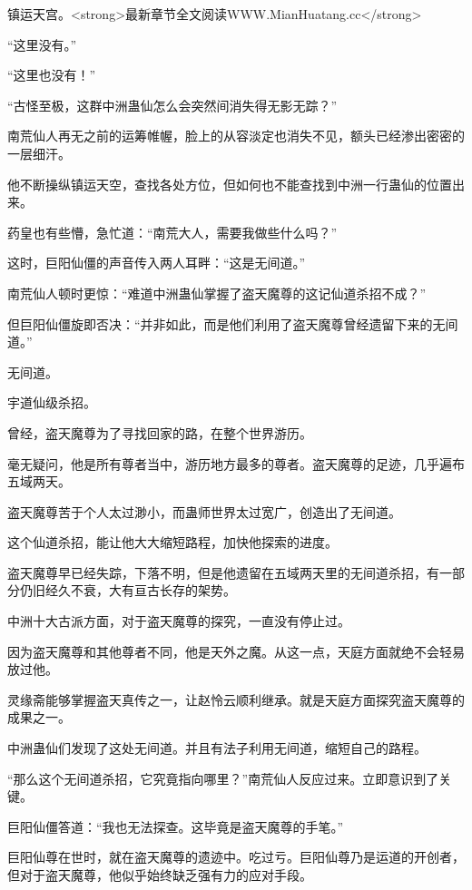 
\begin{this_body}

镇运天宫。<strong>最新章节全文阅读WWW.MianHuatang.cc</strong>

“这里没有。”

“这里也没有！”

“古怪至极，这群中洲蛊仙怎么会突然间消失得无影无踪？”

南荒仙人再无之前的运筹帷幄，脸上的从容淡定也消失不见，额头已经渗出密密的一层细汗。

他不断操纵镇运天空，查找各处方位，但如何也不能查找到中洲一行蛊仙的位置出来。

药皇也有些懵，急忙道：“南荒大人，需要我做些什么吗？”

这时，巨阳仙僵的声音传入两人耳畔：“这是无间道。”

南荒仙人顿时更惊：“难道中洲蛊仙掌握了盗天魔尊的这记仙道杀招不成？”

但巨阳仙僵旋即否决：“并非如此，而是他们利用了盗天魔尊曾经遗留下来的无间道。”

无间道。

宇道仙级杀招。

曾经，盗天魔尊为了寻找回家的路，在整个世界游历。

毫无疑问，他是所有尊者当中，游历地方最多的尊者。盗天魔尊的足迹，几乎遍布五域两天。

盗天魔尊苦于个人太过渺小，而蛊师世界太过宽广，创造出了无间道。

这个仙道杀招，能让他大大缩短路程，加快他探索的进度。

盗天魔尊早已经失踪，下落不明，但是他遗留在五域两天里的无间道杀招，有一部分仍旧经久不衰，大有亘古长存的架势。

中洲十大古派方面，对于盗天魔尊的探究，一直没有停止过。

因为盗天魔尊和其他尊者不同，他是天外之魔。从这一点，天庭方面就绝不会轻易放过他。

灵缘斋能够掌握盗天真传之一，让赵怜云顺利继承。就是天庭方面探究盗天魔尊的成果之一。

中洲蛊仙们发现了这处无间道。并且有法子利用无间道，缩短自己的路程。

“那么这个无间道杀招，它究竟指向哪里？”南荒仙人反应过来。立即意识到了关键。

巨阳仙僵答道：“我也无法探查。这毕竟是盗天魔尊的手笔。”

巨阳仙尊在世时，就在盗天魔尊的遗迹中。吃过亏。巨阳仙尊乃是运道的开创者，但对于盗天魔尊，他似乎始终缺乏强有力的应对手段。


\end{this_body}
